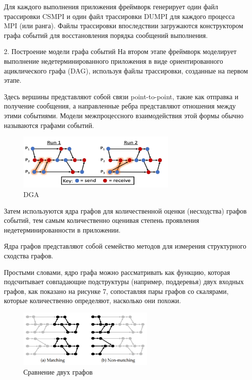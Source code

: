 Для каждого выполнения приложения фреймворк генерирует один файл трассировки CSMPI и один файл трассировки DUMPI для каждого процесса MPI (или ранга). Файлы трассировки впоследствии загружаются конструктором графа событий для восстановления порядка сообщений выполнения.
\newline

2.	Построение модели графа событий
На втором этапе фреймворк моделирует выполнение недетерминированного приложения в виде ориентированного ациклического графа (DAG), используя файлы трассировки, созданные на первом этапе.

Здесь вершины представляют собой связи point-to-point, такие как отправка и получение сообщения, а направленные ребра представляют отношения между этими событиями. Модели межпроцессного взаимодействия этой формы обычно называются графами событий.

\begin{figure}[h]
	\centering
	\includegraphics[width=0.7\textwidth]{ResearchNotes/images/krekhtunova/dga.png}
	\caption{DGA} 
\end{figure}

Затем используются ядра графов для количественной оценки (несходства) графов событий, тем самым количественно оценивая степень проявления недетерминированности в приложении.

Ядра графов представляют собой семейство методов для измерения структурного сходства графов. 

Простыми словами, ядро графа можно рассматривать как функцию, которая подсчитывает совпадающие подструктуры (например, поддеревья) двух входных графов, как показано на рисунке 7, сопоставляя пары графов со скалярами, которые количественно определяют, насколько они похожи.

\begin{figure}[h]
	\centering
	\includegraphics[width=0.6\textwidth]{ResearchNotes/images/krekhtunova/graph_comp.png}
	\caption{Сравнение двух графов} 
\end{figure}

